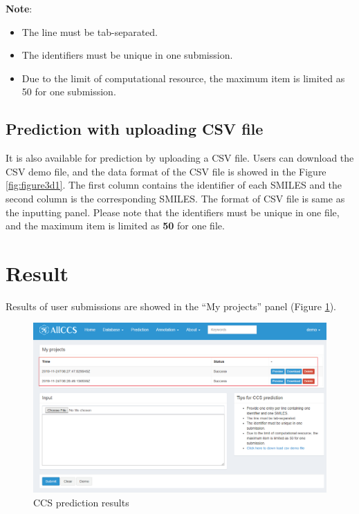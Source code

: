 \documentclass[12pt,]{book}
\providecommand{\tightlist}{%
  \setlength{\itemsep}{0pt}\setlength{\parskip}{0pt}}
\theoremstyle{definition}
\theoremstyle{definition}
\theoremstyle{definition}
\theoremstyle{remark}
\begin{document}
\textbf{Note}:

\begin{itemize}
\tightlist
\item
  The line must be tab-separated.
\item
  The identifiers must be unique in one submission.
\item
  Due to the limit of computational resource, the maximum item is
  limited as 50 for one submission.
\end{itemize}

\subsection{Prediction with uploading CSV file}\label{chapter3d1d2}

It is also available for prediction by uploading a CSV file. Users can
download the CSV demo file, and the data format of the CSV file is
showed in the Figure \ref{fig:figure3d1}. The first column contains the
identifier of each SMILES and the second column is the corresponding
SMILES. The format of CSV file is same as the inputting panel. Please
note that the identifiers must be unique in one file, and the maximum
item is limited as \textbf{50} for one file.

\section{Result}\label{chapter3d2}

Results of user submissions are showed in the ``My projects'' panel
(Figure \ref{fig:figure3d2}).

\begin{figure}

{\centering \includegraphics{images/chapter3/figure3.2prediction_result} 

}

\caption{CCS prediction results}\label{fig:figure3d2}
\end{figure}
\end{document}
